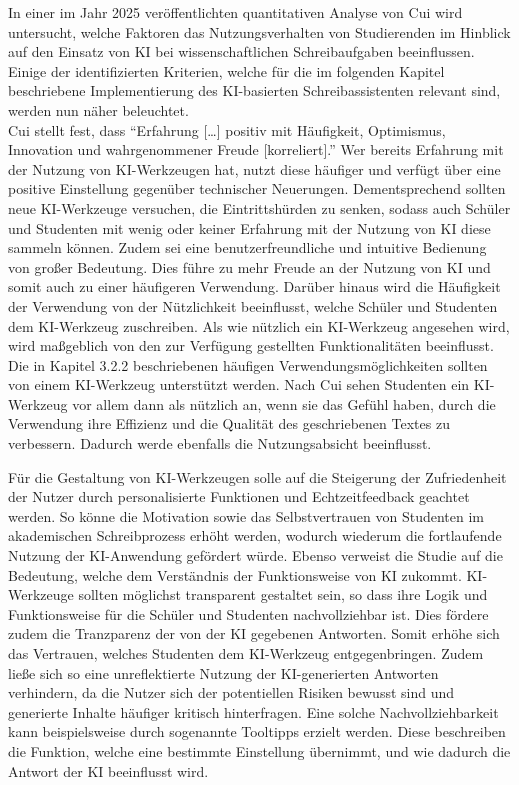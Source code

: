 \documentclass[../main.tex]{subfiles}
\begin{document}
In einer im Jahr 2025 veröffentlichten quantitativen Analyse von Cui wird untersucht, welche Faktoren das Nutzungsverhalten von Studierenden im Hinblick auf den 
Einsatz von KI bei wissenschaftlichen Schreibaufgaben beeinflussen.\cite{influencingUsingAi} Einige der identifizierten Kriterien, welche für die im folgenden Kapitel 
beschriebene Implementierung des KI-basierten Schreibassistenten relevant sind, werden nun näher beleuchtet. \\ 

Cui stellt fest, dass "`Erfahrung […] positiv mit Häufigkeit, Optimismus, Innovation und wahrgenommener Freude [korreliert]."'\cite[6]{influencingUsingAi} Wer bereits 
Erfahrung mit der Nutzung von KI-Werkzeugen hat, nutzt diese häufiger und verfügt über eine positive Einstellung gegenüber technischer Neuerungen. Dementsprechend 
sollten neue KI-Werkzeuge versuchen, die Eintrittshürden zu senken, sodass auch Schüler und Studenten mit wenig oder keiner Erfahrung mit der Nutzung von KI diese 
sammeln können. Zudem sei eine benutzerfreundliche und intuitive Bedienung von großer Bedeutung\cite[6]{influencingUsingAi}. Dies führe zu mehr Freude an der Nutzung 
von KI und somit auch zu einer häufigeren Verwendung. Darüber hinaus wird die Häufigkeit der Verwendung von der Nützlichkeit beeinflusst, welche Schüler und Studenten 
dem KI-Werkzeug zuschreiben. Als wie nützlich ein KI-Werkzeug angesehen wird, wird maßgeblich von den zur Verfügung gestellten Funktionalitäten beeinflusst. Die in 
Kapitel 3.2.2 beschriebenen häufigen Verwendungsmöglichkeiten sollten von einem KI-Werkzeug unterstützt werden. Nach Cui sehen Studenten ein KI-Werkzeug vor allem dann 
als nützlich an, wenn sie das Gefühl haben, durch die Verwendung ihre Effizienz und die Qualität des geschriebenen Textes zu verbessern. Dadurch werde ebenfalls die 
Nutzungsabsicht beeinflusst\cite[7]{influencingUsingAi}. 

Für die Gestaltung von KI-Werkzeugen solle auf die Steigerung der Zufriedenheit der Nutzer durch personalisierte Funktionen und Echtzeitfeedback geachtet 
werden\cite[10]{influencingUsingAi}. So könne die Motivation sowie das Selbstvertrauen von Studenten im akademischen Schreibprozess erhöht werden, wodurch 
wiederum die fortlaufende Nutzung der KI-Anwendung gefördert würde\cite[10]{influencingUsingAi}. Ebenso verweist die Studie auf die Bedeutung, welche dem 
Verständnis der Funktionsweise von KI zukommt. KI-Werkzeuge sollten möglichst transparent gestaltet sein, so dass ihre Logik und Funktionsweise für die Schüler und 
Studenten nachvollziehbar ist. Dies fördere zudem die Tranzparenz der von der KI gegebenen Antworten. Somit erhöhe sich das Vertrauen, welches Studenten dem KI-Werkzeug 
entgegenbringen\cite[10]{influencingUsingAi}. Zudem ließe sich so eine unreflektierte Nutzung der KI-generierten Antworten verhindern, da die Nutzer sich der 
potentiellen Risiken bewusst sind und generierte Inhalte häufiger kritisch hinterfragen\cite[10]{influencingUsingAi}. Eine solche Nachvollziehbarkeit kann 
beispielsweise durch sogenannte Tooltipps erzielt werden. Diese beschreiben die Funktion, welche eine bestimmte Einstellung übernimmt, und wie dadurch die Antwort der 
KI beeinflusst wird.  
\end{document}
